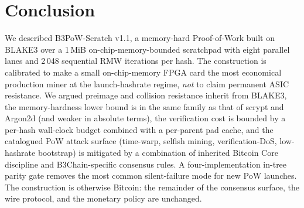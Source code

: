\documentclass[11pt,a4paper]{article}
\theoremstyle{plain}
\theoremstyle{definition}
\theoremstyle{remark}
\begin{document}
\section{Conclusion}\label{sec:conclusion}

We described B3PoW-Scratch v1.1, a memory-hard Proof-of-Work built
on BLAKE3 over a 1\,MiB on-chip-memory-bounded scratchpad with eight
parallel lanes and 2\,048 sequential RMW iterations per hash. The
construction is calibrated to make a small on-chip-memory FPGA card
the most economical production miner at the launch-hashrate regime,
\emph{not} to claim permanent ASIC resistance. We argued
preimage and collision resistance inherit from BLAKE3, the
memory-hardness lower bound is in the same family as that of scrypt
and Argon2d (and weaker in absolute terms), the verification cost
is bounded by a per-hash wall-clock budget combined with a
per-parent pad cache, and the catalogued PoW attack surface
(time-warp, selfish mining, verification-DoS, low-hashrate
bootstrap) is mitigated by a combination of inherited Bitcoin Core
discipline and B3Chain-specific consensus rules. A four-implementation
in-tree parity gate removes the most common silent-failure mode for
new PoW launches. The construction is otherwise Bitcoin: the
remainder of the consensus surface, the wire protocol, and the
monetary policy are unchanged.

%   


\end{document}
